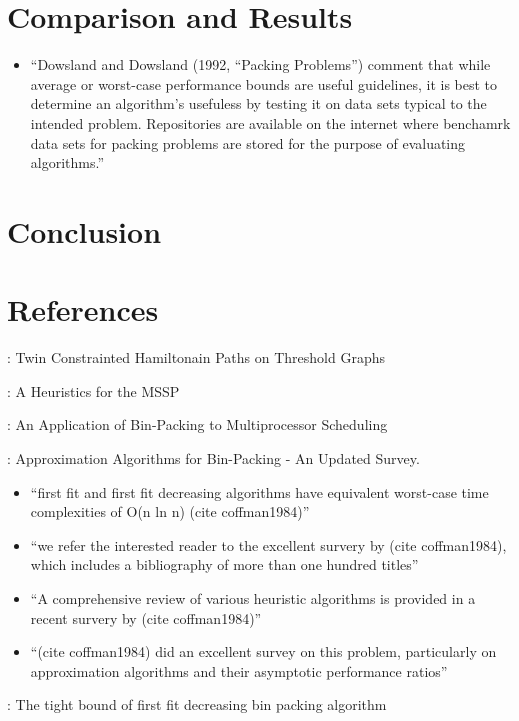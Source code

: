 \documentclass[oribibl]{llncs}
\begin{document}
\section{Comparison and Results}
\label{sec:compresult}

\begin{itemize}
	\item ``Dowsland and Dowsland (1992, ``Packing Problems'') comment that while average or worst-case performance bounds are useful guidelines, it is best to determine an algorithm's usefuless by testing it on data sets typical to the intended problem. Repositories are available on the internet where benchamrk data sets for packing problems are stored for the purpose of evaluating algorithms.''
\end{itemize}

\section{Conclusion}
\label{sec:conclusion}

\section{References}
\cite{becker2010}: Twin Constrainted Hamiltonain Paths on Threshold Graphs 

\cite{becker2015}: A Heuristics for the MSSP

\cite{coffman1978}: An Application of Bin-Packing to Multiprocessor Scheduling

\cite{coffman1984}: Approximation Algorithms for Bin-Packing - An Updated Survey.
\begin{itemize}
	\item ``first fit and first fit decreasing algorithms have equivalent worst-case time complexities of O(n ln n) (cite coffman1984)''
	\item ``we refer the interested reader to the excellent survery by (cite coffman1984), which includes a bibliography of more than one hundred titles''
	\item ``A comprehensive review of various heuristic algorithms is provided in a recent survery by (cite coffman1984)''
	\item ``(cite coffman1984) did an excellent survey on this problem, particularly on approximation algorithms and their asymptotic performance ratios''
\end{itemize}
\cite{dosa2007}: The tight bound of first fit decreasing bin packing algorithm
\end{document}
